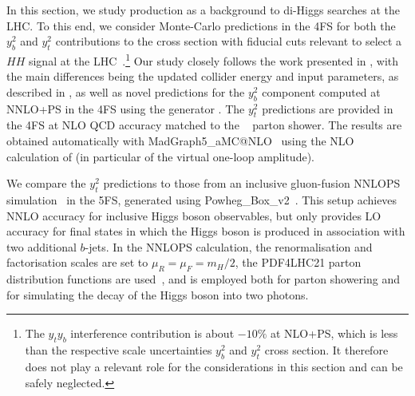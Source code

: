 \documentclass[11pt,a4paper]{article}
\begin{document}
In this section, we study \bbH{} production as a background to di-Higgs searches at the LHC. To this end, we 
consider Monte-Carlo predictions in the 4FS for both the $y_b^2$ and  $y_t^2$ contributions to the \bbH{} cross section
with fiducial cuts relevant to select a $HH$ signal at the LHC~\cite{HDBS-2021-18,CMS-HIG-22-001}.\footnote{The $y_t y_b$ interference contribution is 
about $-10\%$ at NLO+PS, which is less than the respective scale uncertainties  $y_b^2$ and  $y_t^2$ cross section. It therefore does not play a relevant
role for the considerations in this section and can be safely neglected.}
Our study closely follows the work presented in , with the main differences being the updated 
collider energy and input parameters, as described in , as well as novel predictions for the $y_b^2$ component
computed at NNLO+PS in the 4FS using the \minnlo{} generator \cite{Biello:2024pgo}. The $y_t^2$ predictions 
are provided in the 4FS at NLO QCD accuracy matched to the ~\cite{Bierlich:2022pfr} parton shower. 
The results are obtained automatically with {\sc MadGraph5\_aMC@NLO}~\cite{Alwall:2014hca,Frederix:2018nkq} using the NLO 
calculation of  (in particular of the virtual one-loop amplitude).

We compare the $y_t^2$ predictions to those from an inclusive 
gluon-fusion {\sc NNLOPS} simulation~\cite{hamilton:2012rf,hamilton:2013fea,hamilton:2015nsa} in the 5FS, 
generated using {\sc Powheg\_Box\_v2}~\cite{nason:2004rx,frixione:2007vw,alioli:2010xd}. 
This setup achieves NNLO accuracy for inclusive Higgs boson observables, but only provides LO accuracy for final states 
in which the Higgs boson is produced in association with two additional $b$-jets. In the {\sc NNLOPS} calculation, the 
renormalisation and factorisation scales are set to $\mu_R = \mu_F = m_H/2$, the PDF4LHC21 parton distribution functions 
are used~\cite{PDF4LHCWorkingGroup:2022cjn}, and  is employed both for parton showering and for simulating 
the decay of the Higgs boson into two photons.
\end{document}
